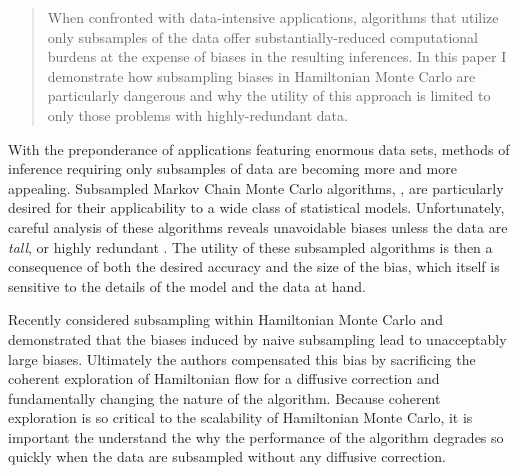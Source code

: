 \documentclass{article}
\begin{document}


\begin{abstract}
When confronted with data-intensive applications, algorithms that utilize only subsamples 
of the data offer substantially-reduced computational burdens at the expense of biases
in the resulting inferences.  In this paper I demonstrate how subsampling biases in 
Hamiltonian Monte Carlo are particularly dangerous and why the utility of this approach
is limited to only those problems with highly-redundant data.
\end{abstract}

With the preponderance of applications featuring enormous data sets,
methods of inference requiring only subsamples of data are becoming 
more and more appealing.  Subsampled Markov Chain Monte Carlo 
algorithms, \cite{NeiswangerEtAl:2013, WellingEtAl:2011}, are particularly
desired for their applicability to a wide class of statistical models.  
Unfortunately, careful analysis of these algorithms reveals unavoidable 
biases unless the data are \textit{tall}, or highly redundant 
\cite{BardenetEtAl:2014, TehEtAl:2014, VollmerEtAl:2015}.  
The utility of these subsampled algorithms is then a consequence 
of both the desired accuracy and the size of the bias, which itself 
is sensitive to the details of the model and the data at hand.

Recently \cite{ChenEtAl:2014} considered subsampling within Hamiltonian
Monte Carlo \cite{DuaneEtAl:1987, Neal:2011, BetancourtEtAl:2014} and 
demonstrated that the biases induced by naive subsampling lead to 
unacceptably large biases.  Ultimately the authors compensated this bias by 
sacrificing the coherent exploration of Hamiltonian flow for a diffusive 
correction and fundamentally changing the nature of the algorithm.
Because coherent exploration is so critical to the scalability of Hamiltonian 
Monte Carlo, it is important the understand the why the performance of
the algorithm degrades so quickly when the data are subsampled without
any diffusive correction.  
\end{document}
